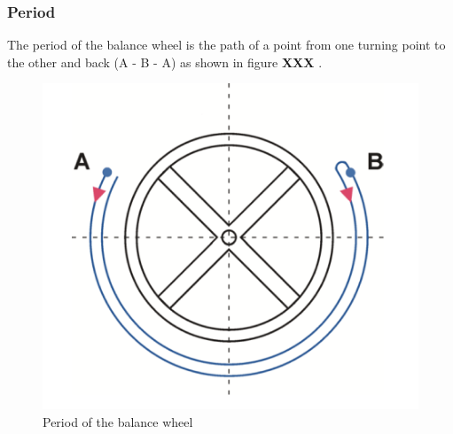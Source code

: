 \documentclass[12pt, a4paper]{report}
\begin{document}
\subsubsection{Period}
The period of the balance wheel is the path of a point from one turning point to the other and back (A - B - A) as shown in figure \textbf{XXX} \cite{Witschi_basics}.
    \begin{figure}[H]
    \centering
    \includegraphics[scale=0.4]{Images/period.png}
    
    \caption{Period of the balance wheel \cite{Witschi_basics}}
    \end{figure}
\bigskip
\end{document}
